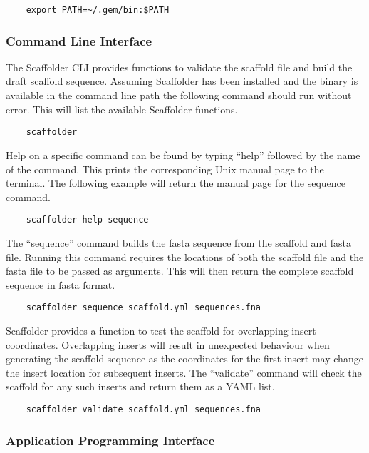 \documentclass[10pt]{bmc_article}
\newenvironment{bmcformat}{\begin{raggedright}\baselineskip20pt\sloppy\setboolean{publ}{false}}{\end{raggedright}\baselineskip20pt\sloppy}
\begin{document}
\begin{bmcformat}
  \begin{verbatim}
    export PATH=~/.gem/bin:$PATH
  \end{verbatim}

\subsubsection*{Command Line Interface} %

The Scaffolder CLI provides functions to validate the scaffold file and build
the draft scaffold sequence. Assuming Scaffolder has been installed and the
binary is available in the command line path the following command should run
without error. This will list the available Scaffolder functions. \pb

  \begin{verbatim}
    scaffolder
  \end{verbatim}

Help on a specific command can be found by typing ``help'' followed by the
name of the command. This prints the corresponding Unix manual page to the
terminal. The following example will return the manual page for the sequence
command. \pb

  \begin{verbatim}
    scaffolder help sequence
  \end{verbatim} 

The ``sequence'' command builds the fasta sequence from the scaffold and fasta
file. Running this command requires the locations of both the scaffold file
and the fasta file to be passed as arguments. This will then return the
complete scaffold sequence in fasta format. \pb

  \begin{verbatim}
    scaffolder sequence scaffold.yml sequences.fna
  \end{verbatim}

Scaffolder provides a function to test the scaffold for overlapping insert
coordinates. Overlapping inserts will result in unexpected behaviour when
generating the scaffold sequence as the coordinates for the first insert may
change the insert location for subsequent inserts. The ``validate'' command
will check the scaffold for any such inserts and return them as a YAML list.
\pb

  \begin{verbatim}
    scaffolder validate scaffold.yml sequences.fna
  \end{verbatim}

\subsubsection*{Application Programming Interface} %


\end{bmcformat}
\end{document}
